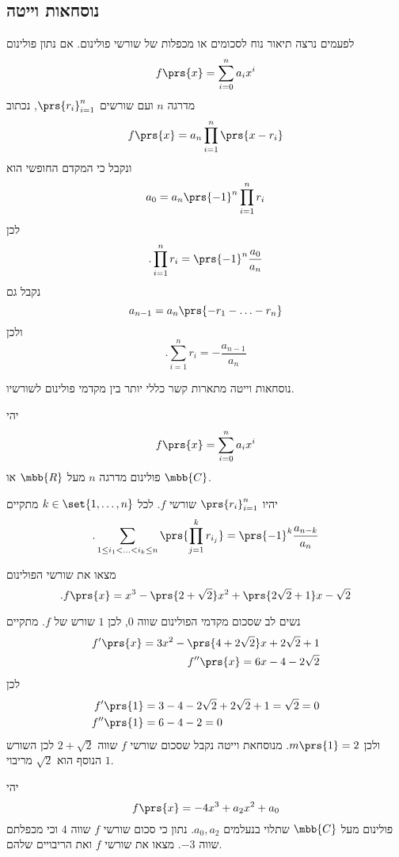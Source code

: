 \documentclass[article, 10pt,oneside]{article}
\begin{document}
\subsection*{נוסחאות וייטה}

לפעמים נרצה תיאור נוח לסכומים או מכפלות של שורשי פולינום.
אם נתון פולינום
\[f\prs{x} = \sum_{i = 0}^n a_i x^i\]
מדרגה
$n$
ועם שורשים
$\prs{r_i}_{i = 1}^n$,
נכתוב
\[f\prs{x} = a_n \prod_{i = 1}^n \prs{x-r_i}\]
ונקבל כי המקדם החופשי הוא
\[a_0 = a_n \prs{-1}^n \prod_{i=1}^n r_i\]
לכן
\[\text{.} \prod_{i=1}^n r_i = \prs{-1}^n \frac{a_0}{a_n} \]
נקבל גם
\[a_{n-1} = a_n\prs{-r_1 - \ldots - r_n}\]
ולכן
\[\text{.} \sum_{i=1}^n r_i = -\frac{a_{n-1}}{a_n}\]

נוסחאות וייטה מתארות קשר כללי יותר בין מקדמי פולינום לשורשיו.

\begin{theorem}
יהי
\[f\prs{x} = \sum_{i = 0}^n a_i x^i\]
פולינום מדרגה
$n$
מעל
$\mbb{R}$
או
$\mbb{C}$.

יהיו
$\prs{r_i}_{i = 1}^n$
שורשי
$f$.
לכל
$k \in \set{1, \ldots, n}$
מתקיים
\[\text{.} \sum_{1 \leq i_1 < \ldots < i_k \leq n} \prs{\prod_{j=1}^k r_{i_j}} = \prs{-1}^k \frac{a_{n-k}}{a_n}\]
\end{theorem}

\begin{exercise}
מצאו את שורשי הפולינום
\[\text{.} f\prs{x} = x^3 - \prs{2 + \sqrt{2}}x^2 + \prs{2 \sqrt{2} + 1}x - \sqrt{2}\]
\end{exercise}

\begin{solution}
נשים לב שסכום מקדמי הפולינום שווה
$0$,
לכן
$1$
שורש של
$f$.
מתקיים
\begin{align*}
f'\prs{x} = 3x^2 - \prs{4 + 2\sqrt{2}} x + 2 \sqrt{2} + 1 \\
f''\prs{x} = 6x - 4 - 2 \sqrt{2}
\end{align*}
לכן
\begin{align*}
f'\prs{1} &= 3 - 4 - 2\sqrt{2} + 2 \sqrt{2} + 1 = \sqrt{2} = 0 \\
f''\prs{1} &= 6-4-2 = 0
\end{align*}
ולכן
$m\prs{1} = 2$.
מנוסחאת וייטה נקבל שסכום שורשי
$f$
שווה
$2+\sqrt{2}$
לכן השורש הנוסף הוא
$\sqrt{2}$
מריבוי
$1$.
\end{solution}

\begin{exercise}
יהי
\[f\prs{x} = -4 x^3 + a_2 x^2 + a_0\]
פולינום מעל
$\mbb{C}$
שתלוי בנעלמים
$a_0, a_2$.
נתון כי סכום שורשי
$f$
שווה
$4$
וכי מכפלתם שווה
$-3$.
מצאו את שורשי
$f$
ואת הריבויים שלהם.
\end{exercise}
\end{document}
